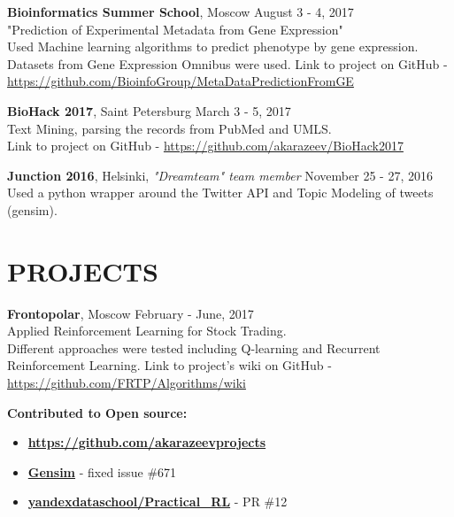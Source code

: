 \documentclass[margin, 9pt]{res} %
\begin{document}
\begin{resume}
\textbf{Bioinformatics Summer School}, Moscow  \hfill August 3 - 4, 2017 \\
"Prediction of Experimental Metadata from Gene Expression" \\
Used Machine learning algorithms to predict phenotype by gene expression. Datasets from Gene Expression Omnibus were used. Link to project on GitHub - \\ \href{https://github.com/BioinfoGroup/MetaDataPredictionFromGE}{https://github.com/BioinfoGroup/MetaDataPredictionFromGE}

\textbf{BioHack 2017}, Saint Petersburg \hfill March 3 - 5, 2017 \\
Text Mining, parsing the records from PubMed and UMLS. \\
Link to project on GitHub - \href{https://github.com/akarazeev/BioHack2017}{https://github.com/akarazeev/BioHack2017}

\textbf{Junction 2016}, Helsinki, {\sl "Dreamteam" team member} \hfill November 25 - 27, 2016 \\
Used a python wrapper around the Twitter API and Topic Modeling of tweets (gensim).


\section{PROJECTS}

\textbf{Frontopolar}, Moscow  \hfill February - June, 2017 \\
Applied Reinforcement Learning for Stock Trading. \\Different approaches were tested including Q-learning and Recurrent Reinforcement Learning. Link to project's wiki on GitHub - \href{https://github.com/FRTP/Algorithms/wiki}{https://github.com/FRTP/Algorithms/wiki}

\textbf{Contributed to Open source:}
\begin{itemize}
	\item \href{https://github.com/akarazeevprojects}{\textbf{https://github.com/akarazeevprojects}}
	\item \href{https://github.com/RaRe-Technologies/gensim}{\textbf{Gensim}} - fixed issue \#671
	\item \href{https://github.com/yandexdataschool/Practical_RL}{\textbf{yandexdataschool/Practical\_RL}} - PR \#12
\end{itemize}


\end{resume}
\end{document}
